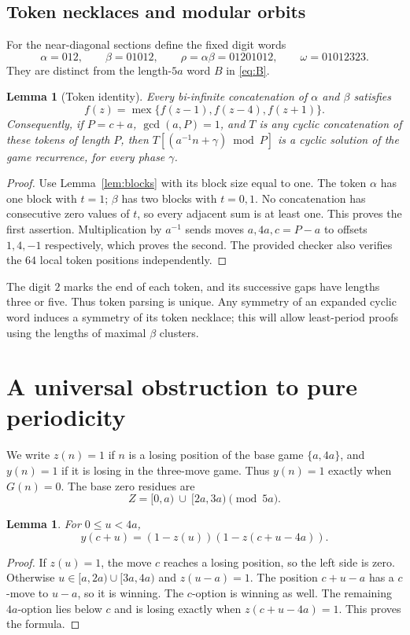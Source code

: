 \documentclass[11pt]{article}
\newtheorem{lemma}[theorem]{Lemma}
\theoremstyle{remark}\newtheorem{remark}[theorem]{Remark}
\DeclareMathOperator{\mex}{mex}
\newcommand{\half}[2]{[#1,#2)}
\begin{document}
\subsection{Token necklaces and modular orbits}
For the near-diagonal sections define the fixed digit words
\[
\alpha=012,\qquad \beta=01012,\qquad
\rho=\alpha\beta=01201012,\qquad \omega=01012323.
\]
They are distinct from the length-$5a$ word $B$ in \eqref{eq:B}.
\begin{lemma}[Token identity]\label{lem:tokens}
Every bi-infinite concatenation of $\alpha$ and $\beta$ satisfies
\[
 f(z)=\mex\{f(z-1),f(z-4),f(z+1)\}.
\]
Consequently, if $P=c+a$, $\gcd(a,P)=1$, and $T$ is any cyclic
concatenation of these tokens of length $P$, then
$T[(a^{-1}n+\gamma)\bmod P]$ is a cyclic solution of the game recurrence,
for every phase $\gamma$.
\end{lemma}
\begin{proof}
Use Lemma~\ref{lem:blocks} with its block size equal to one. The token
$\alpha$ has one block with $t=1$; $\beta$ has two blocks with $t=0,1$.
No concatenation has consecutive zero values of $t$, so every adjacent
sum is at least one. This proves the first assertion. Multiplication by
$a^{-1}$ sends moves $a,4a,c=P-a$ to offsets $1,4,-1$ respectively,
which proves the second. The provided checker also verifies the $64$
local token positions independently.
\end{proof}
The digit $2$ marks the end of each token, and its successive gaps have
lengths three or five. Thus token parsing is unique. Any symmetry of an
expanded cyclic word induces a symmetry of its token necklace; this will
allow least-period proofs using the lengths of maximal $\beta$ clusters.


\section{A universal obstruction to pure periodicity}
We write $z(n)=1$ if $n$ is a losing position of the base game $\{a,4a\}$, and $y(n)=1$ if it is losing in the three-move game. Thus $y(n)=1$ exactly when $G(n)=0$. The base zero residues are
\[Z=\half{0}{a}\ \cup\ \half{2a}{3a}\pmod{5a}.\]

\begin{lemma}\label{lem:firstzeros}
For $0\le u<4a$,
\begin{equation}\label{eq:firstzeros}
 y(c+u)=(1-z(u))(1-z(c+u-4a)).
\end{equation}
\end{lemma}
\begin{proof}
If $z(u)=1$, the move $c$ reaches a losing position, so the left side is zero. Otherwise $u\in\half{a}{2a}\cup\half{3a}{4a}$ and $z(u-a)=1$. The position $c+u-a$ has a $c$-move to $u-a$, so it is winning. The $c$-option is winning as well. The remaining $4a$-option lies below $c$ and is losing exactly when $z(c+u-4a)=1$. This proves the formula.
\end{proof}
\end{document}
